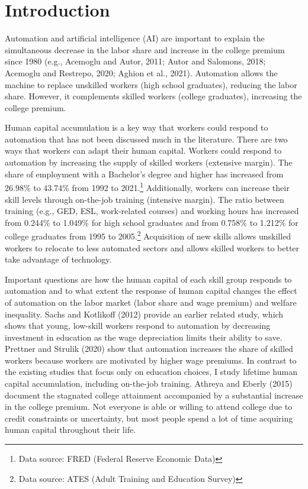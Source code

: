 \documentclass[12pt]{article}
\begin{document}
\section{Introduction}
Automation and artificial intelligence (AI) are important to explain the simultaneous decrease in the labor share and increase in the college premium since 1980 (e.g., Acemoglu and Autor, 2011\nocite{AcemogluAutor2011}; Autor and Salomons, 2018\nocite{AutorSalomons2018}; Acemoglu and Restrepo, 2020\nocite{AcemogluRestrepo2020}; Aghion et al., 2021\nocite{Aghionetal2021}). Automation allows the machine to replace unskilled workers (high school graduates), reducing the labor share. However, it complements skilled workers (college graduates), increasing the college premium. 

Human capital accumulation is a key way that workers could respond to automation that has not been discussed much in the literature. There are two ways that workers can adapt their human capital. Workers could respond to automation by increasing the supply of skilled workers (extensive margin). The share of employment with a Bachelor's degree and higher has increased from 26.98\% to 43.74\% from 1992 to 2021.\footnote{Data source: FRED (Federal Reserve Economic Data)} Additionally, workers can increase their skill levels through on-the-job training (intensive margin). The ratio between training (e.g., GED, ESL, work-related courses) and working hours has increased from 0.244\% to 1.049\% for high school graduates and from 0.758\% to 1.212\% for college graduates from 1995 to 2005.\footnote{Data source: ATES (Adult Training and Education Survey)} Acquisition of new skills allows unskilled workers to relocate to less automated sectors and allows skilled workers to better take advantage of technology. 

Important questions are how the human capital of each skill group responds to automation and to what extent the response of human capital changes the effect of automation on the labor market (labor share and wage premium) and welfare inequality. Sachs and Kotlikoff (2012)\nocite{SachsKotlikoff2012} provide an earlier related study, which shows that young, low-skill workers respond to automation by decreasing investment in education as the wage depreciation limits their ability to save. Prettner and Strulik (2020)\nocite{PrettnerStrulik2020} show that automation increases the share of skilled workers because workers are motivated by higher wage premiums. In contrast to the existing studies that focus only on education choices, I study lifetime human capital accumulation, including on-the-job training. Athreya and Eberly (2015)\nocite{AthreyaEberly2015} document the stagnated college attainment accompanied by a substantial increase in the college premium. Not everyone is able or willing to attend college due to credit constraints or uncertainty, but most people spend a lot of time acquiring human capital throughout their life.
\end{document}
